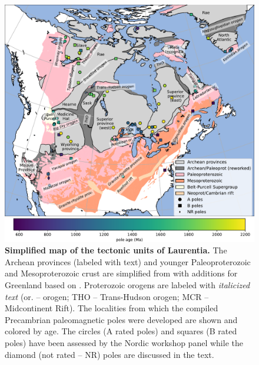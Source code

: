 \documentclass[twocolumn, switch]{article} %
\begin{document}
\begin{figure}
\centering
\includegraphics[width=\textwidth]{../Figures/Fig1_map.pdf}
\caption{\textbf{Simplified map of the tectonic units of Laurentia.} The Archean provinces (labeled with text) and younger Paleoproterozoic and Mesoproterozoic crust are simplified from \cite{Whitmeyer2007a} with additions for Greenland based on \cite{St-Onge2009a}. Proterozoic orogens are labeled with \textit{italicized text} (or. -- orogen; THO  -- Trans-Hudson orogen; MCR -- Midcontinent Rift). The localities from which the compiled Precambrian paleomagnetic poles were developed are shown and colored by age. The circles (A rated poles) and squares (B rated poles) have been assessed by the Nordic workshop panel \citep{Evans2021a} while the diamond (not rated -- NR) poles are discussed in the text.}
\label{fig:Laurentia_map}
\end{figure}
\end{document}
